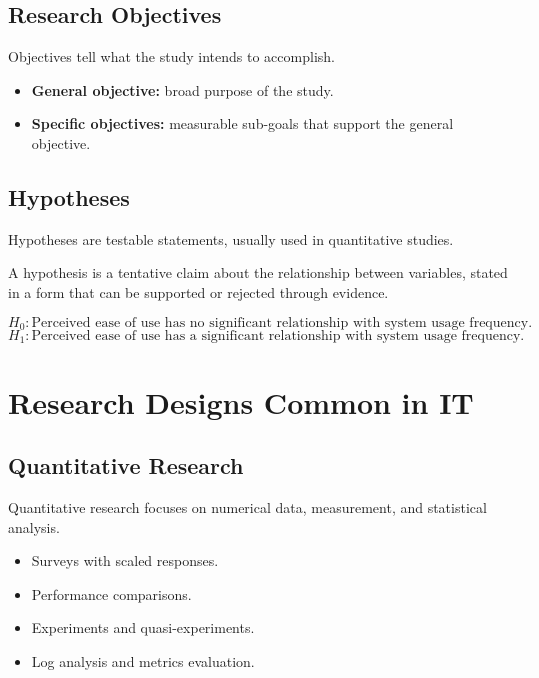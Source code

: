\documentclass[11pt,a4paper]{article}
\begin{document}
\subsection{Research Objectives}

Objectives tell what the study intends to accomplish.

\begin{itemize}[leftmargin=*]
  \item \textbf{General objective:} broad purpose of the study.
  \item \textbf{Specific objectives:} measurable sub-goals that support the general objective.
\end{itemize}

\subsection{Hypotheses}

Hypotheses are testable statements, usually used in quantitative studies.

\begin{definitionbox}[Hypothesis]
A hypothesis is a tentative claim about the relationship between variables, stated in a form that can be supported or rejected through evidence.
\end{definitionbox}

\begin{examplebox}
\[H_0: \text{Perceived ease of use has no significant relationship with system usage frequency.}\]
\[H_1: \text{Perceived ease of use has a significant relationship with system usage frequency.}\]
\end{examplebox}

\section{Research Designs Common in IT}

\subsection{Quantitative Research}

Quantitative research focuses on numerical data, measurement, and statistical analysis.

\begin{itemize}[leftmargin=*]
  \item Surveys with scaled responses.
  \item Performance comparisons.
  \item Experiments and quasi-experiments.
  \item Log analysis and metrics evaluation.
\end{itemize}
\end{document}
